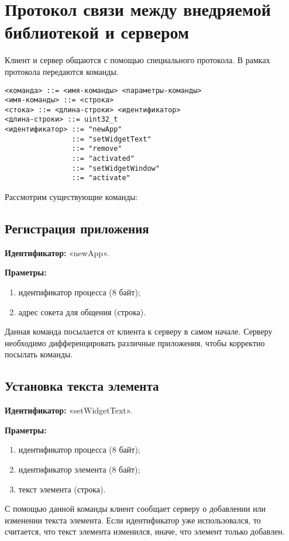 \section{Протокол связи между внедряемой библиотекой и сервером}

Клиент и сервер общаются с помощью специального протокола. В рамках протокола
передаются команды.

\begin{verbatim}
<команда> ::= <имя-команды> <параметры-команды>
<имя-команды> ::= <строка>
<стока> ::= <длина-строки> <идентификатор>
<длина-строки> ::= uint32_t
<идентификатор> ::= "newApp"
                ::= "setWidgetText"
                ::= "remove"
                ::= "activated"
                ::= "setWidgetWindow"
                ::= "activate"
\end{verbatim}

Рассмотрим существующие команды:

\subsection{Регистрация приложения}

\textbf{Идентификатор:} «newApp».

\textbf{Праметры:}
\begin{enumerate}
\item идентификатор процесса (8 байт);
\item адрес сокета для общения (строка).
\end{enumerate}

Данная команда посылается от клиента к серверу в самом начале. Серверу
необходимо дифференцировать различные приложения, чтобы корректно посылать
команды.

\subsection{Установка текста элемента}

\textbf{Идентификатор:} «setWidgetText».

\textbf{Праметры:}
\begin{enumerate}
\item идентификатор процесса (8 байт);
\item идентификатор элемента (8 байт);
\item текст элемента (строка).
\end{enumerate}

С помощью данной команды клиент сообщает серверу о добавлении или изменении
текста элемента. Если идентификатор уже использовался, то считается, что текст
элемента изменился, иначе, что элемент только добавлен.

